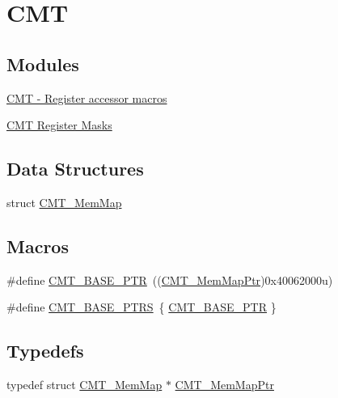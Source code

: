 \hypertarget{group___c_m_t___peripheral}{}\section{C\+M\+T}
\label{group___c_m_t___peripheral}
\subsection*{Modules}
\begin{DoxyCompactItemize}
\item 
\hyperlink{group___c_m_t___register___accessor___macros}{C\+M\+T -\/ Register accessor macros}
\item 
\hyperlink{group___c_m_t___register___masks}{C\+M\+T Register Masks}
\end{DoxyCompactItemize}
\subsection*{Data Structures}
\begin{DoxyCompactItemize}
\item 
struct \hyperlink{struct_c_m_t___mem_map}{C\+M\+T\+\_\+\+Mem\+Map}
\end{DoxyCompactItemize}
\subsection*{Macros}
\begin{DoxyCompactItemize}
\item 
\#define \hyperlink{group___c_m_t___peripheral_gae361f199741d5276c4618edb9ee289b7}{C\+M\+T\+\_\+\+B\+A\+S\+E\+\_\+\+P\+T\+R}~((\hyperlink{group___c_m_t___peripheral_ga9764155d28e775ee5d3200941c07f812}{C\+M\+T\+\_\+\+Mem\+Map\+Ptr})0x40062000u)
\item 
\#define \hyperlink{group___c_m_t___peripheral_gad58e606f11af35440c1b77ff05b55874}{C\+M\+T\+\_\+\+B\+A\+S\+E\+\_\+\+P\+T\+R\+S}~\{ \hyperlink{group___c_m_t___peripheral_gae361f199741d5276c4618edb9ee289b7}{C\+M\+T\+\_\+\+B\+A\+S\+E\+\_\+\+P\+T\+R} \}
\end{DoxyCompactItemize}
\subsection*{Typedefs}
\begin{DoxyCompactItemize}
\item 
typedef struct \hyperlink{struct_c_m_t___mem_map}{C\+M\+T\+\_\+\+Mem\+Map} $\ast$ \hyperlink{group___c_m_t___peripheral_ga9764155d28e775ee5d3200941c07f812}{C\+M\+T\+\_\+\+Mem\+Map\+Ptr}
\end{DoxyCompactItemize}



